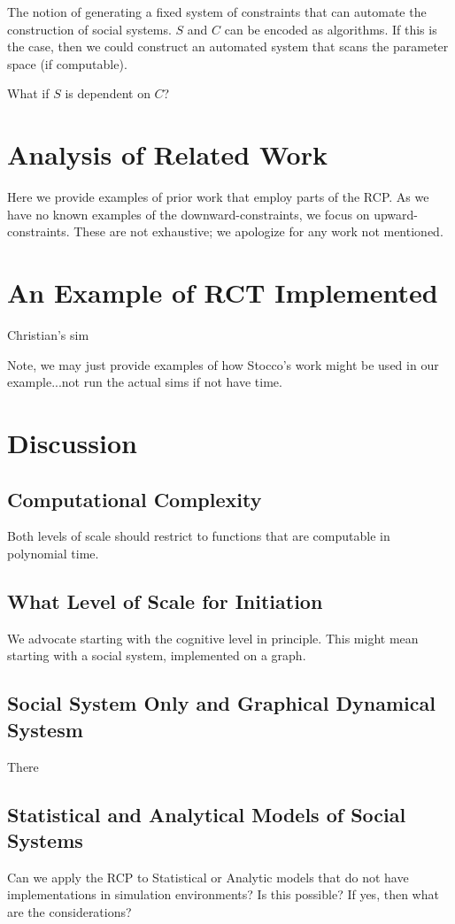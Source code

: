 \documentclass{article}
\begin{document}
 
The notion of generating a fixed system of constraints that can automate the construction of social systems.  $S$ and $C$ can be encoded as algorithms.  If this is the case, then we could construct an automated system that scans the parameter space (if computable).

What if $S$ is dependent on $C$?



\section{Analysis of Related Work}
Here we provide examples of prior work that employ parts of the RCP.  As we have no known examples of the downward-constraints, we focus on upward-constraints.  These are not exhaustive; we apologize for any work not mentioned.  

\section{An Example of RCT Implemented}
Christian's sim

Note, we may just provide examples of how Stocco's work might be used in our example...not run the actual sims if not have time.

\section{Discussion}
\subsection{Computational Complexity}
Both levels of scale should restrict to functions that are computable in polynomial time.  

\subsection{What Level of Scale for Initiation}
We advocate starting with the cognitive level in principle.  This might mean starting with a social system, implemented on a graph. 

\subsection{Social System Only and Graphical Dynamical Systesm}
There 

\subsection{Statistical and Analytical Models of Social Systems}
Can we apply the RCP to Statistical or Analytic models that do not have implementations in simulation environments?  Is this possible?  If yes, then what are the considerations?
\end{document}
